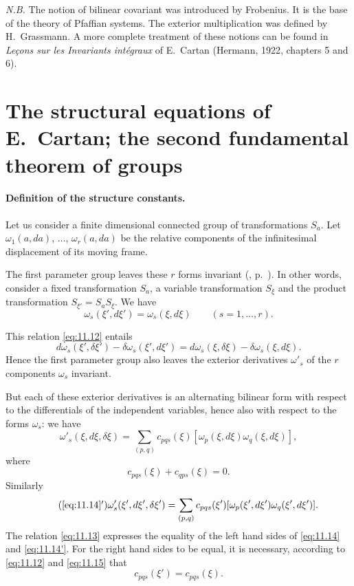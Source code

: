 \emph{N.B.} The notion of bilinear covariant was introduced by Frobenius. It is the base of the theory of Pfaffian systems. The exterior multiplication was defined by H.~Grassmann. A more complete treatment of these notions can be found in \emph{Leçons sur les Invariants intégraux} of E.~Cartan (Hermann, 1922, chapters 5 and 6).


\section{The structural equations of E.~Cartan; the second fundamental theorem of groups}
\label{sec:struct-equat-e}

\paragraph{Definition of the structure constants.}
\label{sec:157}
Let us consider a finite dimensional connected group of transformations $S_{a}$. Let $\omega_{1}(a,da)$, $\dots$, $\omega_{r}(a,da)$ be the relative components of the infinitesimal displacement of its moving frame.

The first parameter group leaves these $r$ forms invariant (, p.~\pageref{sec:80}). In other words, consider a fixed transformation $S_{a}$, a variable transformation $S_{\xi}$ and the product transformation $S_{\xi'}=S_{a}S_{\xi}$. We have
\begin{equation}
  \label{eq:11.12}
  \omega_{s}(\xi',d\xi')=\omega_{s}(\xi,d\xi)\qquad(s=1,\dots,r).
\end{equation}

This relation \eqref{eq:11.12} entails
\begin{equation}
  \label{eq:11.13}
  d\omega_{s}(\xi',\delta\xi')-\delta\omega_{s}(\xi',d\xi')=d\omega_{s}(\xi,\delta\xi)-\delta\omega_{s}(\xi,d\xi).
\end{equation}
Hence the first parameter group also leaves the exterior derivatives $\omega'_{s}$ of the $r$ components $\omega_{s}$ invariant.

But each of these exterior derivatives is an alternating bilinear form with respect to the differentials of the independent variables, hence also with respect to the forms $\omega_{s}$: we have
\begin{equation}
  \label{eq:11.14}
  \omega'_{s}(\xi,d\xi,\delta\xi)=\sum_{(p,q)}c_{pqs}(\xi)[\omega_{p}(\xi,d\xi)\omega_{q}(\xi,d\xi)],
\end{equation}
where
\begin{equation}
  \label{eq:11.15}
  c_{pqs}(\xi)+c_{qps}(\xi)=0.
\end{equation}
Similarly
\begin{equation}
  \label{eq:11.14'}\tag{\ref{eq:11.14}$'$}
  \omega'_{s}(\xi',d\xi',\delta\xi')=\sum_{(p,q)}c_{pqs}(\xi')[\omega_{p}(\xi',d\xi')\omega_{q}(\xi',d\xi')].
\end{equation}
The relation \eqref{eq:11.13} expresses the equality of the left hand sides of \eqref{eq:11.14} and \eqref{eq:11.14'}. For the right hand sides to be equal, it is necessary, according to \eqref{eq:11.12} and \eqref{eq:11.15} that
\[
c_{pqs}(\xi')=c_{pqs}(\xi).
\]

